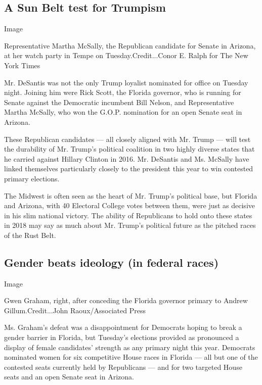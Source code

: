 \hypertarget{a-sun-belt-test-for-trumpism}{%
\subsection{A Sun Belt test for
Trumpism}\label{a-sun-belt-test-for-trumpism}}

Image

Representative Martha McSally, the Republican candidate for Senate in
Arizona, at her watch party in Tempe on Tuesday.Credit...Conor E. Ralph
for The New York Times

Mr. DeSantis was not the only Trump loyalist nominated for office on
Tuesday night. Joining him were Rick Scott, the Florida governor, who is
running for Senate against the Democratic incumbent Bill Nelson, and
Representative Martha McSally, who won the G.O.P. nomination for an open
Senate seat in Arizona.

These Republican candidates --- all closely aligned with Mr. Trump ---
will test the durability of Mr. Trump's political coalition in two
highly diverse states that he carried against Hillary Clinton in 2016.
Mr. DeSantis and Ms. McSally have linked themselves particularly closely
to the president this year to win contested primary elections.

The Midwest is often seen as the heart of Mr. Trump's political base,
but Florida and Arizona, with 40 Electoral College votes between them,
were just as decisive in his slim national victory. The ability of
Republicans to hold onto these states in 2018 may say as much about Mr.
Trump's political future as the pitched races of the Rust Belt.

\hypertarget{gender-beats-ideology-in-federal-races}{%
\subsection{Gender beats ideology (in federal
races)}\label{gender-beats-ideology-in-federal-races}}

Image

Gwen Graham, right, after conceding the Florida governor primary to
Andrew Gillum.Credit...John Raoux/Associated Press

Ms. Graham's defeat was a disappointment for Democrats hoping to break a
gender barrier in Florida, but Tuesday's elections provided as
pronounced a display of female candidates' strength as any primary night
this year. Democrats nominated women for six competitive House races in
Florida --- all but one of the contested seats currently held by
Republicans --- and for two targeted House seats and an open Senate seat
in Arizona.

